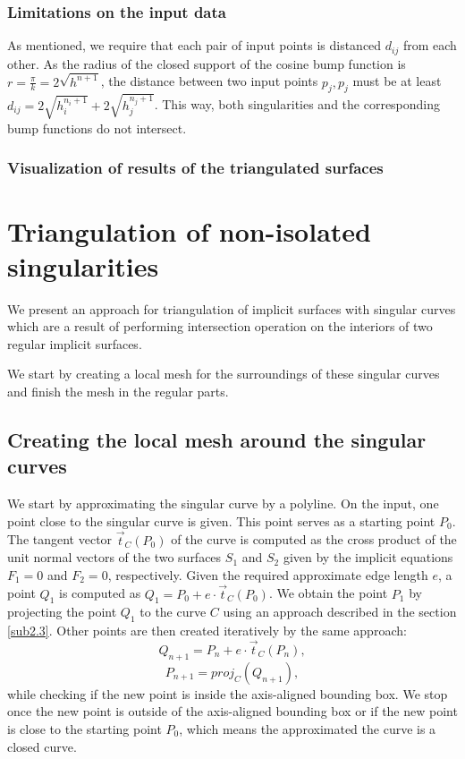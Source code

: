 \subsubsection*{Limitations on the input data}
As mentioned, we require that each pair of input points is
distanced $d_{ij}$ from each other. As the radius of the closed support
of the cosine bump function is $r=\frac{\pi}{k}=2\sqrt{h^{n+1}}$, the 
distance between two input points $p_j, p_j$ must be at least
$d_{ij} = 2\sqrt{h_i^{n_i+1}}+2\sqrt{h_j^{n_j+1}}$. This way, both singularities
and the corresponding bump functions do not intersect. 

\subsubsection*{Visualization of results of the triangulated surfaces}

\section{Triangulation of non-isolated singularities}
\label{sub3.3}

We present an approach for triangulation of implicit surfaces with singular
curves which are
a result of performing intersection operation on the interiors of two
regular implicit surfaces.

We start by creating a local mesh for the surroundings of these singular
curves and finish the mesh in the regular parts.

\subsection{Creating the local mesh around the singular curves}

We start by approximating the singular curve by a polyline.
On the input, one point close to the singular curve is given. This point serves as
a starting point $P_0$. The tangent vector $\vec{t}_C(P_0)$ of the curve is computed as
the cross product of the unit normal vectors of the two surfaces $S_1$ and $S_2$ given
by the implicit equations $F_1=0$ and $F_2=0$, respectively.
Given the required approximate edge length $e$, a point $Q_1$ is computed as
$Q_1 = P_0 + e \cdot \vec{t}_C(P_0)$. We obtain the point $P_1$ by projecting the point 
$Q_1$ to the curve $C$ using an approach described in the section \ref{sub2.3}.
Other points are then created iteratively by the same approach:
$$Q_{n+1} = P_n + e \cdot \vec{t}_C(P_n),$$
$$P_{n+1} = proj_C(Q_{n+1}),$$
while checking if the new point is inside the axis-aligned bounding box.
We stop once the new point is outside of the axis-aligned bounding box or
if the new point is close to the starting point $P_0$, which means the approximated
the curve is a closed curve.

